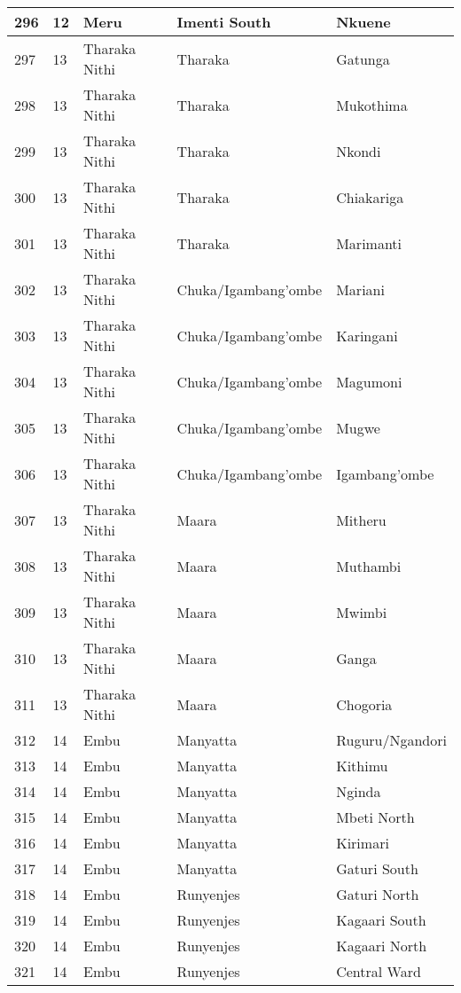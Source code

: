 \begin{table}[!ht]
\begin{tabular}{|l|l|l|l|l|}
        296 & 12 & Meru & Imenti South & Nkuene \\ \hline
        297 & 13 & Tharaka Nithi & Tharaka & Gatunga \\ \hline
        298 & 13 & Tharaka Nithi & Tharaka & Mukothima \\ \hline
        299 & 13 & Tharaka Nithi & Tharaka & Nkondi \\ \hline
        300 & 13 & Tharaka Nithi & Tharaka & Chiakariga \\ \hline
        301 & 13 & Tharaka Nithi & Tharaka & Marimanti \\ \hline
        302 & 13 & Tharaka Nithi & Chuka/Igambang’ombe & Mariani \\ \hline
        303 & 13 & Tharaka Nithi & Chuka/Igambang’ombe & Karingani \\ \hline
        304 & 13 & Tharaka Nithi & Chuka/Igambang’ombe & Magumoni \\ \hline
        305 & 13 & Tharaka Nithi & Chuka/Igambang’ombe & Mugwe \\ \hline
        306 & 13 & Tharaka Nithi & Chuka/Igambang’ombe & Igambang’ombe \\ \hline
        307 & 13 & Tharaka Nithi & Maara & Mitheru \\ \hline
        308 & 13 & Tharaka Nithi & Maara & Muthambi \\ \hline
        309 & 13 & Tharaka Nithi & Maara & Mwimbi \\ \hline
        310 & 13 & Tharaka Nithi & Maara & Ganga \\ \hline
        311 & 13 & Tharaka Nithi & Maara & Chogoria \\ \hline
        312 & 14 & Embu & Manyatta & Ruguru/Ngandori \\ \hline
        313 & 14 & Embu & Manyatta & Kithimu \\ \hline
        314 & 14 & Embu & Manyatta & Nginda \\ \hline
        315 & 14 & Embu & Manyatta & Mbeti North \\ \hline
        316 & 14 & Embu & Manyatta & Kirimari \\ \hline
        317 & 14 & Embu & Manyatta & Gaturi South \\ \hline
        318 & 14 & Embu & Runyenjes & Gaturi North \\ \hline
        319 & 14 & Embu & Runyenjes & Kagaari South \\ \hline
        320 & 14 & Embu & Runyenjes & Kagaari North \\ \hline
        321 & 14 & Embu & Runyenjes & Central Ward \\ \hline

\end{tabular}
\end{table}

